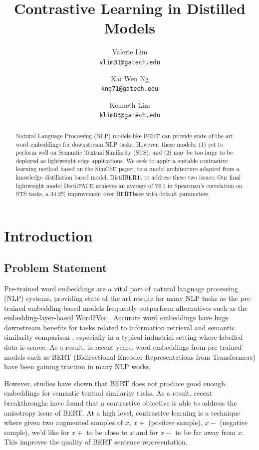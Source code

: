 \documentclass[10pt,twocolumn,letterpaper]{article}
\title{\vspace{-2.0cm}Contrastive Learning in Distilled Models}
\author{
Valerie Lim \\ {\tt\small vlim31@gatech.edu}
\and
Kai Wen Ng \\ {\tt\small kng71@gatech.edu}
\and
Kenneth Lim \\ {\tt\small klim83@gatech.edu}
}
\date{\vspace{-5ex}}
\begin{document}
\maketitle

\begin{abstract}
    Natural Language Processing (NLP) models like BERT can provide state of the art word embeddings for downstream NLP tasks. However, these models: (1) yet to perform well on Semantic Textual Similarity (STS), and (2) may be too large to be deployed as lightweight edge applications. We seek to apply a suitable contrastive learning method based on the SimCSE paper, to a model architecture adapted from a knowledge distillation based model, DistilBERT, to address these two issues. Our final lightweight model DistilFACE achieves an average of 72.1 in Spearman’s correlation on STS tasks, a 34.2\% improvement over BERTbase with default parameters.
\end{abstract}


\section{Introduction}

\subsection{Problem Statement}

Pre-trained word embeddings are a vital part of natural language processing (NLP) systems, providing state of the art results for many NLP tasks  as the pre-trained embedding-based models frequently outperform alternatives such as the embedding-layer-based Word2Vec \cite{farahmand}. Accurate word embeddings have huge downstream benefits for tasks related to information retrieval and semantic similarity comparison \cite{2105.11741}, especially in a typical industrial setting where labelled data is scarce. As a result, in recent years, word embeddings from pre-trained models such as BERT (Bidirectional Encoder Representations from Transformers) have been gaining traction in many NLP works.

However, studies \cite{2104.08821} \cite{2105.11741} have shown that BERT does not produce good enough embeddings for semantic textual similarity tasks. As a result, recent breakthroughs \cite{2104.08821} \cite{1907.11692} have found that a contrastive objective is able to address the anisotropy issue of BERT. At a high level, contrastive learning is a technique where given two augmented samples of \(x\), \(x+\) (positive sample), \(x-\) (negative sample), we'd like for \(x+\) to be close to \(x\) and for \(x-\) to be far away from \(x\). This improves the quality of BERT sentence representation. 
\end{document}

